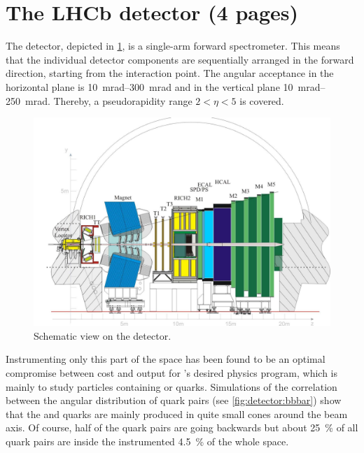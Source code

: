 
\section{The LHCb detector (4 pages)}
\label{sec:detector:lhcb}

The \lhcb detector, depicted in \cref{fig:detector:scheme}, is a single-arm
forward spectrometer. This means that the individual detector
components are sequentially arranged in the forward direction, starting from
the interaction point. The angular acceptance in the horizontal plane is
\SIrange{10}{300}{mrad} and in the vertical plane \SIrange{10}{250}{mrad}.
Thereby, a pseudorapidity range $2<\eta <5$ is covered.
\begin{figure}[htb]
\centering
\includegraphics[width=\textwidth]{04-Detector/figs/Lhcbdetektor.pdf}
\caption{Schematic view on the \lhcb detector\cite{Alves:2008zz}.}
\label{fig:detector:scheme}
\end{figure}
Instrumenting only this part of the space has been found to be an optimal
compromise between cost and output for \lhcb's desired physics program, which
is mainly to study particles containing \bquark or \cquark quarks. Simulations
of the correlation between the angular distribution of \bbbar quark pairs (see
\cref{fig:detector:bbbar}) show that the \bquark and \bquarkbar quarks are
mainly produced in quite small cones around the beam axis. Of course, half of
the \bbbar quark pairs are going backwards but about \SI{25}{\percent} of all
\bbbar quark pairs are inside the instrumented \SI{4.5}{\percent} of the whole
space.

